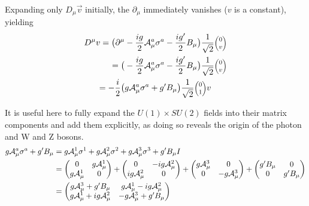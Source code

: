     Expanding only $D_{\mu} \vec{v}$ initially, the $\partial_{\mu}$ immediately vanishes ($v$ is a constant), yielding 
    \begin{equation} \begin{split}
        D^{\mu} v  = \big( \partial^{\mu} & - \frac{ig}{2} \wField^a_{\mu} \sigma^a - \frac{ig'}{2} B_{\mu} \big) \frac{1}{\sqrt{2}}\minimatrix{0\\v} \\
        = \big( & - \frac{ig}{2} \wField^a_{\mu} \sigma^a - \frac{ig'}{2} B_{\mu} \big) \frac{1}{\sqrt{2}}\minimatrix{0\\v} \\
        = - \frac{i}{2} \big( & g \wField^a_{\mu} \sigma^a + g' B_{\mu} \big) \frac{1}{\sqrt{2}}\minimatrix{0\\1} v
    \end{split} \end{equation}

    It is useful here to fully expand the $U(1) \times SU(2)$ fields into their matrix components and add them explicitly,
        as doing so reveals the origin of the photon and W and Z bosons.
    \begin{equation} \begin{split}
        g \mathcal{A}^a_{\mu} \sigma^a + g' B_{\mu} & =
            g \mathcal{A}^1_{\mu} \sigma^1
            + g \mathcal{A}^2_{\mu} \sigma^2
            + g \mathcal{A}^3_{\mu} \sigma^3
            + g' B_{\mu} I \\
        & = \begin{pmatrix}
            0 & g\mathcal{A}^1_{\mu} \\ g\mathcal{A}^1_{\mu} & 0 \end{pmatrix}
            + \begin{pmatrix} 0 & -ig\mathcal{A}^2_{\mu} \\ ig\mathcal{A}^2_{\mu} & 0 \end{pmatrix}
            + \begin{pmatrix} g\mathcal{A}^3_{\mu} & 0 \\ 0 & -g\mathcal{A}^3_{\mu} \end{pmatrix}
            + \begin{pmatrix} g'B_{\mu} & 0 \\ 0 & g'B_{\mu}
        \end{pmatrix} \\
        & = \begin{pmatrix} 
            g\mathcal{A}^3_{\mu} + g'B_{\mu} & g\mathcal{A}^1_{\mu} - ig\mathcal{A}^2_{\mu} \\
            g\mathcal{A}^1_{\mu} + ig\mathcal{A}^2_{\mu} & -g\mathcal{A}^3_{\mu} + g'B_{\mu}
        \end{pmatrix}
    \end{split} \end{equation}

